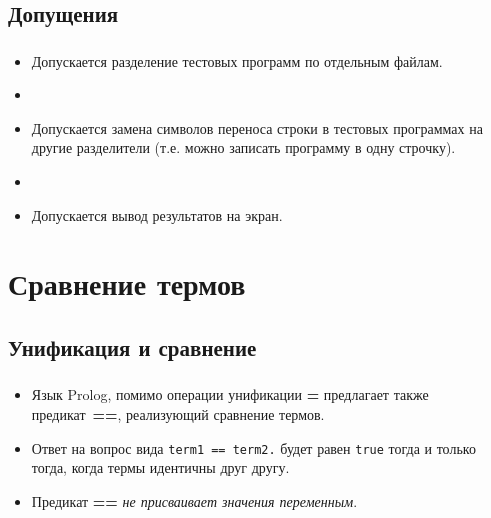 \subsection{Допущения}

\begin{frame}

	\frametitle{\insertsection}
	\framesubtitle{\insertsubsection}
	
	\begin{itemize}
		\item[] Допускается разделение тестовых программ по отдельным файлам.
		\item[]
		\item[] Допускается замена символов переноса строки в тестовых программах на другие разделители (т.е. можно записать программу в одну строчку).
		\item[]
		\item[] Допускается вывод результатов на экран.
	\end{itemize}

\end{frame}





\section{Сравнение термов}

\begin{frame}

	\begin{center}
		\Huge \insertsection
	\end{center}

\end{frame}


\subsection{Унификация и сравнение}


\begin{frame}

	\frametitle{\insertsection}
	\framesubtitle{\insertsubsection}
	
	\begin{itemize}
		\item Язык Prolog, помимо операции унификации \textbf{=} предлагает также предикат~\textbf{==}, реализующий
		сравнение термов.
		\item Ответ на вопрос вида \texttt{term1 == term2.} будет равен \texttt{true} тогда и только тогда, когда термы идентичны друг другу.
		\item Предикат \textbf{==} \textit{не присваивает значения переменным}.
	\end{itemize}

\end{frame}



